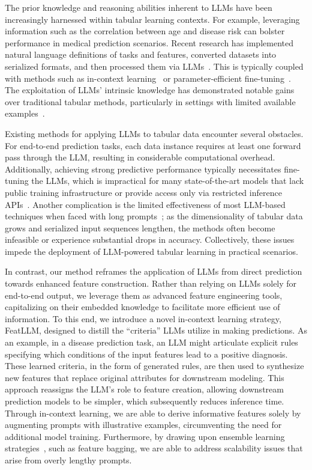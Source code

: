 The prior knowledge and reasoning abilities inherent to LLMs have been increasingly harnessed within tabular learning contexts. For example, leveraging information such as the correlation between age and disease risk can bolster performance in medical prediction scenarios. Recent research has implemented natural language definitions of tasks and features, converted datasets into serialized formats, and then processed them via LLMs~\cite{dinh2022lift,wang2023anypredict}. This is typically coupled with methods such as in-context learning~\cite{nam2023semi} or parameter-efficient fine-tuning~\cite{dinh2022lift,hegselmann2023tabllm}. The exploitation of LLMs’ intrinsic knowledge has demonstrated notable gains over traditional tabular methods, particularly in settings with limited available examples~\cite{hegselmann2023tabllm}.

Existing methods for applying LLMs to tabular data encounter several obstacles. For end-to-end prediction tasks, each data instance requires at least one forward pass through the LLM, resulting in considerable computational overhead. Additionally, achieving strong predictive performance typically necessitates fine-tuning the LLMs, which is impractical for many state-of-the-art models that lack public training infrastructure or provide access only via restricted inference APIs~\cite{anil2023palm,openai2023gpt4}. Another complication is the limited effectiveness of most LLM-based techniques when faced with long prompts~\cite{liu2023lost}; as the dimensionality of tabular data grows and serialized input sequences lengthen, the methods often become infeasible or experience substantial drops in accuracy. Collectively, these issues impede the deployment of LLM-powered tabular learning in practical scenarios.

In contrast, our method reframes the application of LLMs from direct prediction towards enhanced feature construction. Rather than relying on LLMs solely for end-to-end output, we leverage them as advanced feature engineering tools, capitalizing on their embedded knowledge to facilitate more efficient use of information. To this end, we introduce a novel in-context learning strategy, \textsf{FeatLLM}, designed to distill the “criteria” LLMs utilize in making predictions. As an example, in a disease prediction task, an LLM might articulate explicit rules specifying which conditions of the input features lead to a positive diagnosis. These learned criteria, in the form of generated rules, are then used to synthesize new features that replace original attributes for downstream modeling. This approach reassigns the LLM’s role to feature creation, allowing downstream prediction models to be simpler, which subsequently reduces inference time. Through in-context learning, we are able to derive informative features solely by augmenting prompts with illustrative examples, circumventing the need for additional model training. Furthermore, by drawing upon ensemble learning strategies~\cite{breiman2001random}, such as feature bagging, we are able to address scalability issues that arise from overly lengthy prompts.

